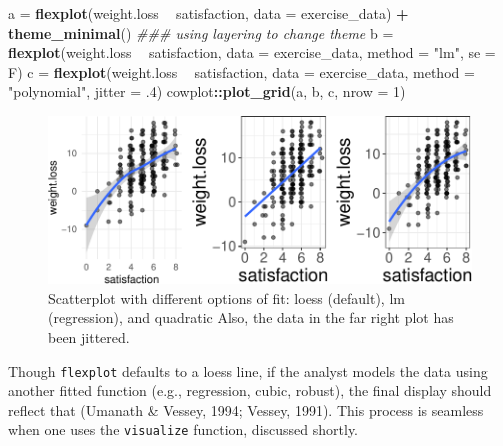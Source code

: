 \documentclass[
  man]{apa6}
\newenvironment{Shaded}{\begin{snugshade}}{\end{snugshade}}
\newcommand{\CommentTok}[1]{\textcolor[rgb]{0.56,0.35,0.01}{\textit{#1}}}
\newcommand{\DataTypeTok}[1]{\textcolor[rgb]{0.13,0.29,0.53}{#1}}
\newcommand{\DecValTok}[1]{\textcolor[rgb]{0.00,0.00,0.81}{#1}}
\newcommand{\FloatTok}[1]{\textcolor[rgb]{0.00,0.00,0.81}{#1}}
\newcommand{\KeywordTok}[1]{\textcolor[rgb]{0.13,0.29,0.53}{\textbf{#1}}}
\newcommand{\NormalTok}[1]{#1}
\newcommand{\OperatorTok}[1]{\textcolor[rgb]{0.81,0.36,0.00}{\textbf{#1}}}
\newcommand{\StringTok}[1]{\textcolor[rgb]{0.31,0.60,0.02}{#1}}
\begin{document}
\begin{Shaded}
\begin{Highlighting}[]
\NormalTok{a =}\StringTok{ }\KeywordTok{flexplot}\NormalTok{(weight.loss }\OperatorTok{~}\StringTok{ }\NormalTok{satisfaction, }\DataTypeTok{data =}\NormalTok{ exercise_data) }\OperatorTok{+}\StringTok{ }
\StringTok{  }\KeywordTok{theme_minimal}\NormalTok{() }\CommentTok{### using layering to change theme}
\NormalTok{b =}\StringTok{ }\KeywordTok{flexplot}\NormalTok{(weight.loss }\OperatorTok{~}\StringTok{ }\NormalTok{satisfaction, }\DataTypeTok{data =}\NormalTok{ exercise_data, }
             \DataTypeTok{method =} \StringTok{"lm"}\NormalTok{, }\DataTypeTok{se =}\NormalTok{ F)}
\NormalTok{c =}\StringTok{ }\KeywordTok{flexplot}\NormalTok{(weight.loss }\OperatorTok{~}\StringTok{ }\NormalTok{satisfaction, }\DataTypeTok{data =}\NormalTok{ exercise_data, }
             \DataTypeTok{method =} \StringTok{"polynomial"}\NormalTok{, }\DataTypeTok{jitter =} \FloatTok{.4}\NormalTok{)}
\NormalTok{cowplot}\OperatorTok{::}\KeywordTok{plot_grid}\NormalTok{(a, b, c, }\DataTypeTok{nrow =} \DecValTok{1}\NormalTok{)}
\end{Highlighting}
\end{Shaded}

\begin{figure}

{\centering \includegraphics[width=0.9\linewidth]{flexplot_psychmeth_files/figure-latex/unnamed-chunk-5-1} 

}

\caption{Scatterplot with different options of fit: loess (default), lm (regression), and quadratic Also, the data in the far right plot has been jittered. }\label{fig:unnamed-chunk-5}
\end{figure}

Though \texttt{flexplot} defaults to a loess line, if the analyst models the data using another fitted function (e.g., regression, cubic, robust), the final display should reflect that (Umanath \& Vessey, 1994; Vessey, 1991). This process is seamless when one uses the \texttt{visualize} function, discussed shortly.
\end{document}
